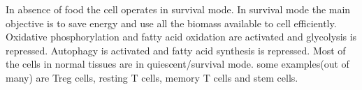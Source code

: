 In absence of food the cell operates in survival mode. In survival mode the main objective is to save energy and use all the biomass available to cell efficiently.
Oxidative phosphorylation and fatty acid oxidation are activated and glycolysis is repressed.
Autophagy is activated and fatty acid synthesis is repressed. Most of the cells in normal tissues are in quiescent/survival mode.
some examples(out of many) are Treg cells, resting T cells, memory T cells and stem cells.
